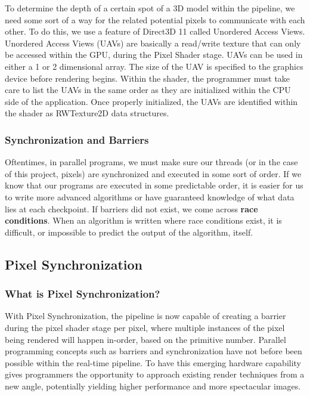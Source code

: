 \documentclass[a4paper, 12pt]{article}
\begin{document}
To determine the depth of a certain spot of a 3D model within the pipeline, we
need some sort of a way for the related potential pixels to communicate with
each other. To do this, we use a feature of Direct3D 11 called Unordered
Access Views. Unordered Access Views (UAVs) are basically a read/write texture
that can only be accessed within the GPU, during the Pixel Shader stage. UAVs
can be used in either a 1 or 2 dimensional array. The size of the UAV is
specified to the graphics device before rendering begins. Within the shader,
the programmer must take care to list the UAVs in the same order as they are
initialized within the CPU side of the application. Once properly initialized,
the UAVs are identified within the shader as RWTexture2D data structures.

\subsubsection{Synchronization and Barriers}

Oftentimes, in parallel programs, we must make sure our threads (or in the
case of this project, pixels) are synchronized and executed in some sort of
order. If we know that our programs are executed in some predictable order, it
is easier for us to write more advanced algorithms or have guaranteed
knowledge of what data lies at each checkpoint. If barriers did not exist, we
come across \textbf{race conditions}. When an algorithm is written where race
conditions exist, it is difficult, or impossible to predict the output of the
algorithm, itself.

\subsection{Pixel Synchronization}

\subsubsection{What is Pixel Synchronization?}

With Pixel Synchronization, the pipeline is now capable of creating a barrier
during the pixel shader stage per pixel, where multiple instances of the pixel
being rendered will happen in-order, based on the primitive number. Parallel
programming concepts such as barriers and synchronization have not before been
possible within the real-time pipeline. To have this emerging hardware
capability gives programmers the opportunity to approach existing render
techniques from a new angle, potentially yielding higher performance and more
spectacular images.
\end{document}
